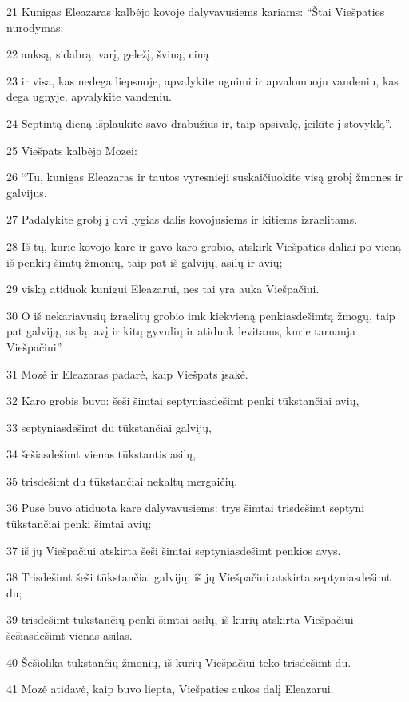 \par 21 Kunigas Eleazaras kalbėjo kovoje dalyvavusiems kariams: “Štai Viešpaties nurodymas: 
\par 22 auksą, sidabrą, varį, geležį, šviną, ciną 
\par 23 ir visa, kas nedega liepsnoje, apvalykite ugnimi ir apvalomuoju vandeniu, kas dega ugnyje, apvalykite vandeniu. 
\par 24 Septintą dieną išplaukite savo drabužius ir, taip apsivalę, įeikite į stovyklą”. 
\par 25 Viešpats kalbėjo Mozei: 
\par 26 “Tu, kunigas Eleazaras ir tautos vyresnieji suskaičiuokite visą grobį­ žmones ir galvijus. 
\par 27 Padalykite grobį į dvi lygias dalis kovojusiems ir kitiems izraelitams. 
\par 28 Iš tų, kurie kovojo kare ir gavo karo grobio, atskirk Viešpaties daliai po vieną iš penkių šimtų žmonių, taip pat iš galvijų, asilų ir avių; 
\par 29 viską atiduok kunigui Eleazarui, nes tai yra auka Viešpačiui. 
\par 30 O iš nekariavusių izraelitų grobio imk kiekvieną penkiasdešimtą žmogų, taip pat galviją, asilą, avį ir kitų gyvulių ir atiduok levitams, kurie tarnauja Viešpačiui”. 
\par 31 Mozė ir Eleazaras padarė, kaip Viešpats įsakė. 
\par 32 Karo grobis buvo: šeši šimtai septyniasdešimt penki tūkstančiai avių, 
\par 33 septyniasdešimt du tūkstančiai galvijų, 
\par 34 šešiasdešimt vienas tūkstantis asilų, 
\par 35 trisdešimt du tūkstančiai nekaltų mergaičių. 
\par 36 Pusė buvo atiduota kare dalyvavusiems: trys šimtai trisdešimt septyni tūkstančiai penki šimtai avių; 
\par 37 iš jų Viešpačiui atskirta šeši šimtai septyniasdešimt penkios avys. 
\par 38 Trisdešimt šeši tūkstančiai galvijų; iš jų Viešpačiui atskirta septyniasdešimt du; 
\par 39 trisdešimt tūkstančių penki šimtai asilų, iš kurių atskirta Viešpačiui šešiasdešimt vienas asilas. 
\par 40 Šešiolika tūkstančių žmonių, iš kurių Viešpačiui teko trisdešimt du. 
\par 41 Mozė atidavė, kaip buvo liepta, Viešpaties aukos dalį Eleazarui. 
